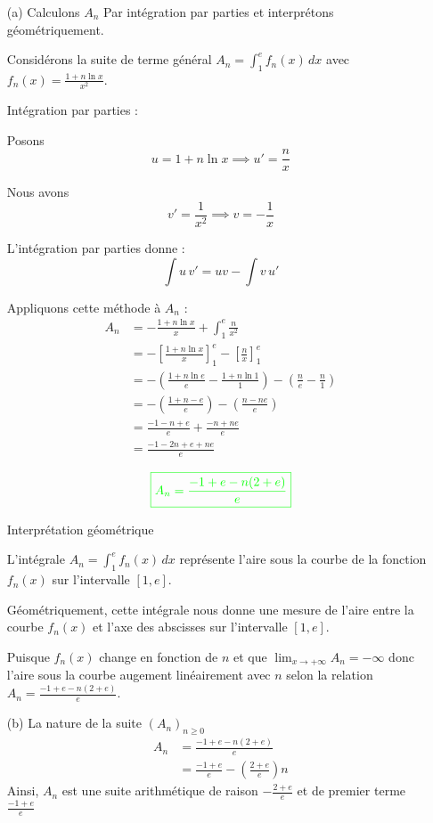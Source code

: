 \documentclass[12pt]{article}
\begin{document}
\begin{itemize}
\item[(a)] Calculons $A_{n}$ Par intégration par parties et interprétons géométriquement.

Considérons la suite de terme général \( A_n = \int_{1}^{e} f_n(x) \, dx \) avec \( f_n(x) = \frac{1 + n \ln x}{x^2} \).

Intégration par parties :

Posons 
\[ u = 1 + n \ln x \implies u' = \frac{n}{x} \]

Nous avons 
\[ v' = \frac{1}{x^2} \implies v = -\frac{1}{x} \]

L'intégration par parties donne :
\[ \int u \, v' = uv - \int v \, u' \]

Appliquons cette méthode à \( A_n \) :
\begin{align*}
A_n &=  -\frac{1 + n \ln x}{x}+\int_{1}^{e}\frac{n}{x^{2}}\\
&=-\left[ \frac{1 + n \ln x}{x}\right]_{1}^{e} -\left[ \frac{n}{x}\right] _{1}^{e}\\
&=-\left( \frac{1 + n \ln e}{e}-\frac{1 + n \ln 1}{1}\right) -\left( \frac{n}{e}-\frac{n}{1}\right)\\
&=-\left( \frac{1 + n-e}{e}\right) -\left( \frac{n-ne}{e}\right)\\
&=\frac{-1 - n+e}{e} + \frac{-n+ne}{e}\\
&=\frac{-1 - 2n+e+ne}{e}\\
\end{align*}
\[\textcolor{green}{\boxed{A_n=\frac{-1+e-n(2+e)}{e}}}\]


Interprétation géométrique

L'intégrale \( A_n = \int_{1}^{e} f_n(x) \, dx \) représente l'aire sous la courbe de la fonction \( f_n(x) \) sur l'intervalle \([1, e]\).

Géométriquement, cette intégrale nous donne une mesure de l'aire entre la courbe \( f_n(x) \) et l'axe des abscisses sur l'intervalle \([1, e]\). 

Puisque \( f_n(x) \) change en fonction de \( n \) et que \(\lim_{x \to +\infty}A_n=-\infty\) donc l'aire sous la courbe augement linéairement avec \( n \) selon la relation \( A_n = \frac{-1+e-n(2+e)}{e} \).

\item[(b)] La nature de la suite $(A_{n})_{n\geq 0}$
\begin{align*}
A_n &= \frac{-1+e-n(2+e)}{e}\\
		&= \frac{-1+e}{e}-\left( \frac{2+e}{e}\right) n
\end{align*}
Ainsi, $A_n$ est une suite arithmétique de raison $-\frac{2+e}{e}$ et de premier terme $\frac{-1+e}{e}$
\end{itemize}
\end{document}
